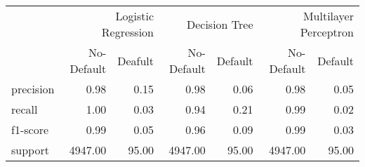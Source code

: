 \begin{table}
\thcenter
\begin{tabular}{lrrrrrr}
 & \multicolumn{2}{r}{Logistic Regression} & \multicolumn{2}{r}{Decision Tree  } & \multicolumn{2}{r}{Multilayer Perceptron} \\
 & No-Default & Deafult & No-Default & Default & No-Default & Default \\
precision & 0.98 & 0.15 & 0.98 & 0.06 & 0.98 & 0.05 \\
recall & 1.00 & 0.03 & 0.94 & 0.21 & 0.99 & 0.02 \\
f1-score & 0.99 & 0.05 & 0.96 & 0.09 & 0.99 & 0.03 \\
support & 4947.00 & 95.00 & 4947.00 & 95.00 & 4947.00 & 95.00 \\
\end{tabular}
\end{table}
